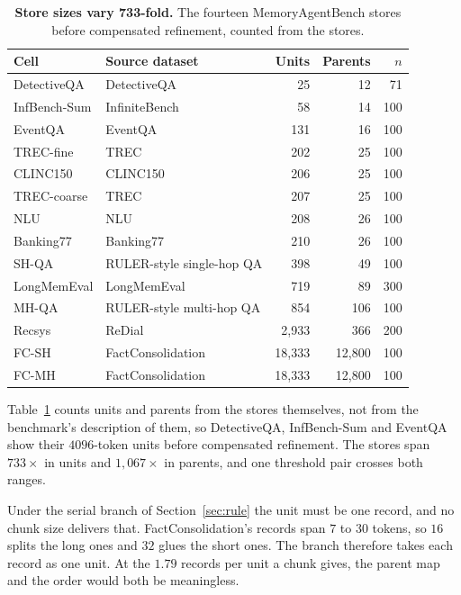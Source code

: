 \documentclass{article}
\newcommand{\tabfont}{\fontsize{7.5}{8.5}\selectfont\renewcommand{\arraystretch}{1.0}}
\begin{document}
\begin{table}[H]
\centering\tabfont
\caption{\textbf{Store sizes vary 733-fold.} The fourteen MemoryAgentBench stores before compensated refinement, counted from the stores.}
\label{tab:stores}
\setlength{\tabcolsep}{5pt}
\begin{tabular}{llrrr}
\toprule
Cell & Source dataset & Units & Parents & $n$ \\
\midrule
DetectiveQA & DetectiveQA & \phantom{00,0}25 & \phantom{0,0}12 & \phantom{0}71 \\
InfBench-Sum & InfiniteBench & \phantom{00,0}58 & \phantom{0,0}14 & 100 \\
EventQA & EventQA & \phantom{00,}131 & \phantom{0,0}16 & 100 \\
TREC-fine & TREC & \phantom{00,}202 & \phantom{0,0}25 & 100 \\
CLINC150 & CLINC150 & \phantom{00,}206 & \phantom{0,0}25 & 100 \\
TREC-coarse & TREC & \phantom{00,}207 & \phantom{0,0}25 & 100 \\
NLU & NLU & \phantom{00,}208 & \phantom{0,0}26 & 100 \\
Banking77 & Banking77 & \phantom{00,}210 & \phantom{0,0}26 & 100 \\
SH-QA & RULER-style single-hop QA & \phantom{00,}398 & \phantom{0,0}49 & 100 \\
LongMemEval & LongMemEval & \phantom{00,}719 & \phantom{0,0}89 & 300 \\
MH-QA & RULER-style multi-hop QA & \phantom{00,}854 & \phantom{0,}106 & 100 \\
Recsys & ReDial & \phantom{0}2{,}933 & \phantom{0,}366 & 200 \\
FC-SH & FactConsolidation & 18{,}333 & 12{,}800 & 100 \\
FC-MH & FactConsolidation & 18{,}333 & 12{,}800 & 100 \\
\bottomrule
\end{tabular}
\end{table}

Table~\ref{tab:stores} counts units and parents from the stores themselves, not from the benchmark's description of them, so DetectiveQA, InfBench-Sum and EventQA show their $4096$-token units before compensated refinement. The stores span $733\times$ in units and $1{,}067\times$ in parents, and one threshold pair crosses both ranges.

Under the serial branch of Section~\ref{sec:rule} the unit must be one record, and no chunk size delivers that. FactConsolidation's records span $7$ to
$30$ tokens, so $16$ splits the long ones and $32$ glues the short ones. The branch therefore takes each record as one unit.
At the $1.79$ records per unit a chunk gives, the parent map and the order would both be meaningless.
\end{document}
